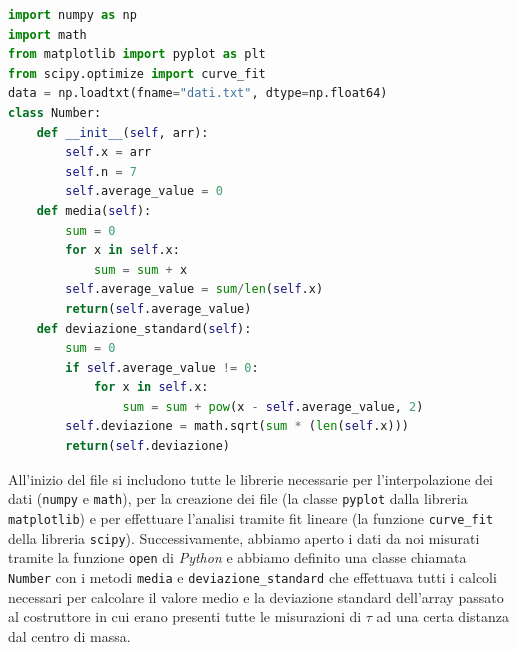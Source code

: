 \documentclass{article}
\begin{document}
\begin{minipage}{0.5\textwidth}
	\begin{lstlisting}[language=Python]
import numpy as np
import math
from matplotlib import pyplot as plt 
from scipy.optimize import curve_fit
data = np.loadtxt(fname="dati.txt", dtype=np.float64)
class Number:
    def __init__(self, arr):
        self.x = arr
        self.n = 7
        self.average_value = 0
    def media(self):
        sum = 0
        for x in self.x:
            sum = sum + x
        self.average_value = sum/len(self.x)
        return(self.average_value)
    def deviazione_standard(self):
        sum = 0
        if self.average_value != 0:
            for x in self.x:
                sum = sum + pow(x - self.average_value, 2)
        self.deviazione = math.sqrt(sum * (len(self.x)))
        return(self.deviazione)
\end{lstlisting}
\end{minipage}
\hspace{0.025\textwidth}
\begin{minipage}{0.5\textwidth}
All'inizio del file si includono tutte le librerie necessarie per l'interpolazione dei dati (\texttt{numpy} e \texttt{math}), per la creazione dei file (la classe \texttt{pyplot} dalla libreria \texttt{matplotlib}) e per effettuare l'analisi tramite fit lineare (la funzione \texttt{curve\_fit} della libreria \texttt{scipy}). Successivamente, abbiamo aperto i dati da noi misurati tramite la funzione \texttt{open} di \emph{Python} e abbiamo definito una classe chiamata \texttt{Number} con i metodi \texttt{media} e \texttt{deviazione\_standard} che effettuava tutti i calcoli necessari per calcolare il valore medio e la deviazione standard dell'array passato al costruttore in cui erano presenti tutte le misurazioni di $\tau$ ad una certa distanza dal centro di massa.
\end{minipage}
\end{document}
